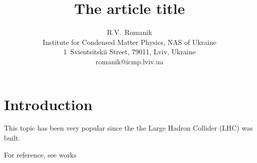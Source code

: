 \documentclass[12pt]{article}
\title{The article title}
\author{R.V.~Romanik
	\\ \small Institute for Condensed Matter Physics, NAS of Ukraine 
	\\ \small 1~Svientsitskii Street, 79011, Lviv, Ukraine 
	\\ \small romanik@icmp.lviv.ua}
\begin{document}
	
	\maketitle
	
	
	\section{Introduction}
	This topic has been very popular since the the Large Hadron Collider (LHC) was built.
	
	For reference, see works~\cite{Cooper} \nocite{*}
	
	
	
	
\end{document}
